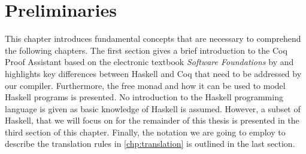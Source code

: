 \chapter{Preliminaries} \label{chp:preliminaries}
This chapter introduces fundamental concepts that are necessary to comprehend the following chapters.
The first section gives a brief introduction to the Coq Proof Assistant based on the electronic textbook \textit{Software Foundations} by \cite{Pierce:2019} and highlights key differences between Haskell and Coq that need to be addressed by our compiler.
Furthermore, the free monad and how it can be used to model Haskell programs is presented.
No introduction to the Haskell programming language is given as basic knowledge of Haskell is assumed.
However, a subset of Haskell, that we will focus on for the remainder of this thesis is presented in the third section of this chapter.
Finally, the notation we are going to employ to describe the translation rules in \autoref{chp:translation} is outlined in the last section.





